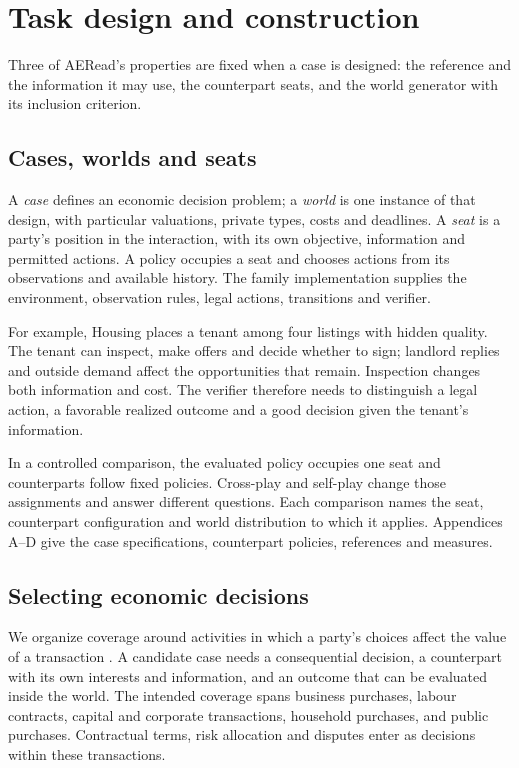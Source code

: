 \section{Task design and construction}
\label{sec:task-design}

Three of AERead's properties are fixed when a case is designed: the
reference and the information it may use, the counterpart seats, and the
world generator with its inclusion criterion.

\subsection{Cases, worlds and seats}
\label{sec:task-formulation}

A \emph{case} defines an economic decision problem; a \emph{world} is
one instance of that design, with particular valuations, private types,
costs and deadlines. A \emph{seat} is a party's position in the
interaction, with its own objective, information and permitted actions.
A policy occupies a seat and chooses actions from its observations and
available history. The family implementation supplies the environment,
observation rules, legal actions, transitions and verifier.

For example, Housing places a tenant among four listings with hidden
quality. The tenant can inspect, make offers and decide whether to sign;
landlord replies and outside demand affect the opportunities that remain.
Inspection changes both information and cost. The verifier therefore
needs to distinguish a legal action, a favorable realized outcome and a
good decision given the tenant's information.

In a controlled comparison, the evaluated policy occupies one seat and
counterparts follow fixed policies. Cross-play and self-play change those
assignments and answer different questions. Each comparison names the
seat, counterpart configuration and world distribution to which it
applies. Appendices A--D give the case specifications, counterpart
policies, references and measures.

\subsection{Selecting economic decisions}

We organize coverage around activities in which a party's choices affect
the value of a transaction \citep{li2026activities}. A candidate case
needs a consequential decision, a counterpart with its own interests and
information, and an outcome that can be evaluated inside the world.
The intended coverage spans business purchases, labour contracts, capital
and corporate transactions, household purchases, and public purchases.
Contractual terms, risk allocation and disputes enter as decisions within
these transactions.

